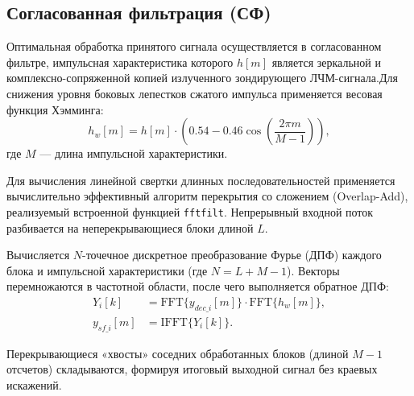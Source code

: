 \subsection{Согласованная фильтрация (СФ)}
Оптимальная обработка принятого сигнала осуществляется в согласованном фильтре, импульсная характеристика которого $h[m]$ является зеркальной и комплексно-сопряженной копией излученного зондирующего ЛЧМ-сигнала.Для снижения уровня боковых лепестков сжатого импульса применяется весовая функция Хэмминга:
$$ h_w[m] = h[m] \cdot \left(0.54 - 0.46 \cos\left(\frac{2\pi m}{M-1}\right)\right), $$
где $M$ --- длина импульсной характеристики.

Для вычисления линейной свертки длинных последовательностей применяется вычислительно эффективный алгоритм перекрытия со сложением (Overlap-Add), реализуемый встроенной функцией \texttt{fftfilt}. Непрерывный входной поток разбивается на неперекрывающиеся блоки длиной $L$. 

Вычисляется $N$-точечное дискретное преобразование Фурье (ДПФ) каждого блока и импульсной характеристики (где $N = L + M - 1$). Векторы перемножаются в частотной области, после чего выполняется обратное ДПФ:
\begin{align}
    Y_i[k] &= \text{FFT}\{y_{dec\_i}[m]\} \cdot \text{FFT}\{h_w[m]\}, \\
    y_{sf\_i}[m] &= \text{IFFT}\{Y_i[k]\}.
\end{align}

Перекрывающиеся «хвосты» соседних обработанных блоков (длиной $M-1$ отсчетов) складываются, формируя итоговый выходной сигнал без краевых искажений.
